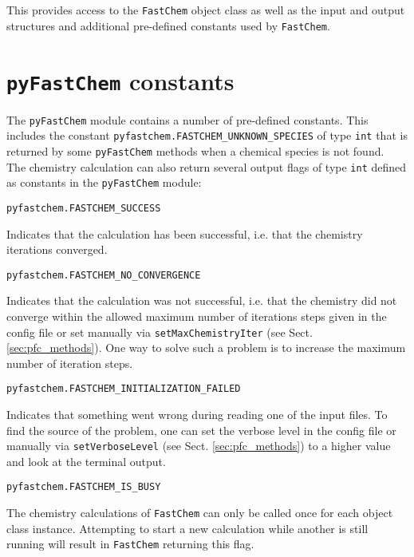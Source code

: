 \documentclass[numbers=noenddot]{aux/fcmanual}
\newcommand{\fc}{\texttt{FastChem}\xspace}
\newcommand{\pfc}{\texttt{pyFastChem}\xspace}
\begin{document}
This provides access to the \fc object class as well as the input and output structures and additional pre-defined constants used by \fc.

\section{\pfc constants}
\label{sec:pfc_constants}

The \pfc module contains a number of pre-defined constants. This includes the constant \lstinline!pyfastchem.FASTCHEM_UNKNOWN_SPECIES! of type \lstinline!int! that is returned by some \pfc methods when a chemical species is not found. \\

The chemistry calculation can also return several output flags of type \lstinline!int! defined as constants in the \pfc module:

\lstinline!pyfastchem.FASTCHEM_SUCCESS!
\begin{addmargin}[25pt]{0pt}
  Indicates that the calculation has been successful, i.e. that the chemistry iterations converged.
\end{addmargin}
  
\bigbreak
  
\lstinline!pyfastchem.FASTCHEM_NO_CONVERGENCE!
\begin{addmargin}[25pt]{0pt}
  Indicates that the calculation was not successful, i.e. that the chemistry did not converge within the allowed maximum number of iterations steps given in the config file or set manually via \lstinline!setMaxChemistryIter! (see Sect. \ref{sec:pfc_methods}). One way to solve such a problem is to increase the maximum number of iteration steps.
\end{addmargin}
    
\bigbreak
    
\lstinline!pyfastchem.FASTCHEM_INITIALIZATION_FAILED!
\begin{addmargin}[25pt]{0pt}
  Indicates that something went wrong during reading one of the input files. To find the source of the problem, one can set the verbose level in the config file or manually via \lstinline!setVerboseLevel! (see Sect. \ref{sec:pfc_methods}) to a higher value and look at the terminal output.
\end{addmargin}
      
\bigbreak
      
\lstinline!pyfastchem.FASTCHEM_IS_BUSY!
\begin{addmargin}[25pt]{0pt}
  The chemistry calculations of \fc can only be called once for each object class instance. Attempting to start a new calculation while another is still running will result in \fc returning this flag.
\end{addmargin}
        
\end{document}
